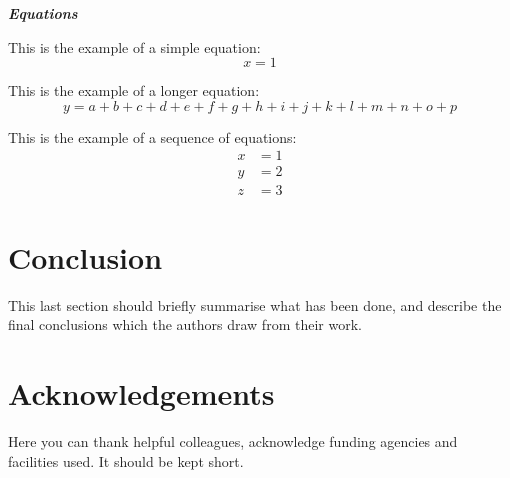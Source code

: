 \documentclass[referee,usenatbib]{ijmathtex}
\newcommand{\textbit}[1]{\textbf{\textit{#1}}}
\newcommand{\inspace}[1]{\vspace*{#1}\noindent}
\begin{document}
\inspace{7mm}%
\textbit{Equations}

\inspace{3mm}%
This is the example of a simple equation:
\begin{equation}
	x=1
\end{equation}

\inspace{3mm}%
This is the example of a longer equation:
\begin{equation}
	y=a+b+c+d+e+f+g+h+i+j+k+l+m+n+o+p
\end{equation}

\inspace{3mm}%
This is the example of a sequence of equations:
\begin{equation}
	\begin{aligned}
		x &= 1 \\
		y &= 2 \\
		z &= 3
	\end{aligned}
\end{equation}

\section{Conclusion}
This last section should brieﬂy summarise what has been done, and describe the ﬁnal conclusions which the authors draw from their work.

\section*{Acknowledgements}
Here you can thank helpful colleagues, acknowledge funding agencies and facilities used. It should be kept short.


%
\end{document}
